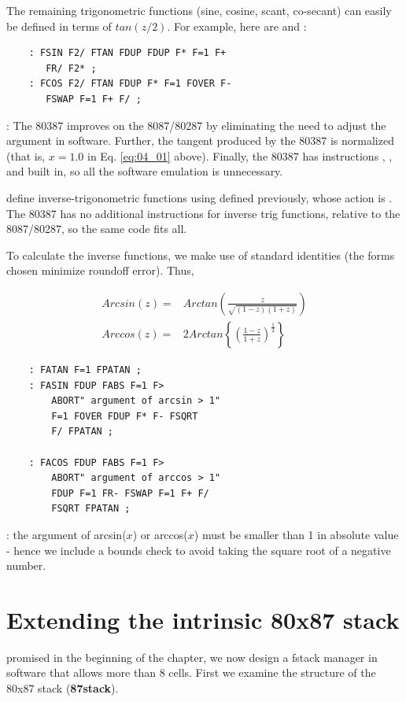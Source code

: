 The remaining trigonometric functions (sine, cosine, scant, co-secant) can easily be defined in terms of $tan(z /2)$. For example, here are  and :

\begin{lstlisting}
    : FSIN F2/ FTAN FDUP FDUP F* F=1 F+
       FR/ F2* ;
    : FCOS F2/ FTAN FDUP F* F=1 FOVER F-
       FSWAP F=1 F+ F/ ;
\end{lstlisting}

\leftbar[1\linewidth]
\Note: The 80387 improves on the 8087/80287 by eliminating the need to adjust the argument in software. Further, the tangent produced by the 80387 is normalized (that is, $x = 1.0$ in Eq. \ref{eq:04_01} above). Finally, the 80387 has instructions , , and  built in, so all the software emulation is unnecessary.
\endleftbar

 define inverse-trigonometric functions using  defined previously, whose action is . The 80387 has no additional instructions for inverse trig functions, relative to the 8087/80287, so the same code fits all.

To calculate the inverse functions, we make use of standard identities (the forms chosen minimize roundoff error). Thus,

\begin{align}
    Arcsin(z) =& Arctan\left(\frac{z}{\sqrt{(1-z)(1+z)}}\right) \\
    Arccos(z) =& 2 Arctan\left \{\left (\frac{1-z}{1+z}\right)^{\frac{1}{2}}\right \}
\end{align}

\begin{lstlisting}
    : FATAN F=1 FPATAN ;
    : FASIN FDUP FABS F=1 F>
        ABORT" argument of arcsin > 1"
        F=1 FOVER FDUP F* F- FSQRT
        F/ FPATAN ;

    : FACOS FDUP FABS F=1 F>
        ABORT" argument of arccos > 1"
        FDUP F=1 FR- FSWAP F=1 F+ F/
        FSQRT FPATAN ;
\end{lstlisting}

\leftbar[1\linewidth]
\Note: the argument of arcsin($x$) or arccos($x$) must be smaller than 1 in absolute value - hence we include a bounds check to avoid taking the square root of a negative number.
\endleftbar

\section{Extending the intrinsic 80x87 stack} 
\label{sec:Extending}
 promised in the beginning of the chapter, we now design a fstack manager in software that allows more than 8 cells. First we examine the structure of the 80x87 stack (\textbf{87stack}).

